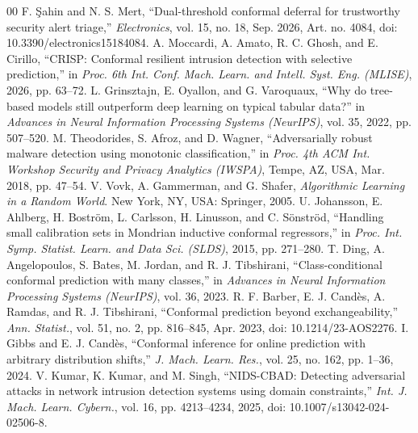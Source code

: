 ﻿\documentclass[conference]{IEEEtran}
\begin{document}
\begin{thebibliography}{00}
 F. \c{S}ahin and N. S. Mert, ``Dual-threshold conformal deferral for trustworthy security alert triage,'' \textit{Electronics}, vol. 15, no. 18, Sep. 2026, Art. no. 4084, doi: 10.3390/electronics15184084.
 A. Moccardi, A. Amato, R. C. Ghosh, and E. Cirillo, ``CRISP: Conformal resilient intrusion detection with selective prediction,'' in \textit{Proc. 6th Int. Conf. Mach. Learn. and Intell. Syst. Eng. (MLISE)}, 2026, pp. 63--72.
 L. Grinsztajn, E. Oyallon, and G. Varoquaux, ``Why do tree-based models still outperform deep learning on typical tabular data?'' in \textit{Advances in Neural Information Processing Systems (NeurIPS)}, vol. 35, 2022, pp. 507--520.
 M. Theodorides, S. Afroz, and D. Wagner, ``Adversarially robust malware detection using monotonic classification,'' in \textit{Proc. 4th ACM Int. Workshop Security and Privacy Analytics (IWSPA)}, Tempe, AZ, USA, Mar. 2018, pp. 47--54.
 V. Vovk, A. Gammerman, and G. Shafer, \textit{Algorithmic Learning in a Random World}. New York, NY, USA: Springer, 2005.
 U. Johansson, E. Ahlberg, H. Bostr\"om, L. Carlsson, H. Linusson, and C. S\"onstr\"od, ``Handling small calibration sets in Mondrian inductive conformal regressors,'' in \textit{Proc. Int. Symp. Statist. Learn. and Data Sci. (SLDS)}, 2015, pp. 271--280.
 T. Ding, A. Angelopoulos, S. Bates, M. Jordan, and R. J. Tibshirani, ``Class-conditional conformal prediction with many classes,'' in \textit{Advances in Neural Information Processing Systems (NeurIPS)}, vol. 36, 2023.
 R. F. Barber, E. J. Cand\`es, A. Ramdas, and R. J. Tibshirani, ``Conformal prediction beyond exchangeability,'' \textit{Ann. Statist.}, vol. 51, no. 2, pp. 816--845, Apr. 2023, doi: 10.1214/23-AOS2276.
 I. Gibbs and E. J. Cand\`es, ``Conformal inference for online prediction with arbitrary distribution shifts,'' \textit{J. Mach. Learn. Res.}, vol. 25, no. 162, pp. 1--36, 2024.
 V. Kumar, K. Kumar, and M. Singh, ``NIDS-CBAD: Detecting adversarial attacks in network intrusion detection systems using domain constraints,'' \textit{Int. J. Mach. Learn. Cybern.}, vol. 16, pp. 4213--4234, 2025, doi: 10.1007/s13042-024-02506-8.
\end{thebibliography}
\end{document}
